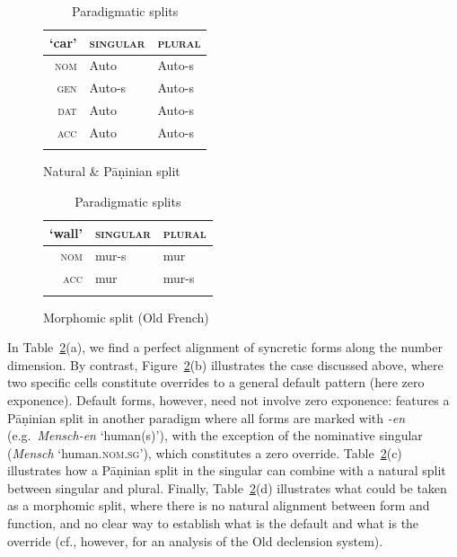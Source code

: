 \documentclass[output=paper
 	        ,biblatex
                ,babelshorthands
                ,newtxmath
                ,draftmode
                ,colorlinks, citecolor=brown
]{langscibook}
\begin{document}
\begin{table}[htb]
\begin{subfigure}{.45\textwidth}
    \begin{tabular}{r|ll}
        \lsptoprule
        `car' & \textsc{singular} & \textsc{plural}\\
        \midrule
        \textsc{nom} & Auto & Auto-s\\
        \textsc{gen} & Auto-s & Auto-s\\
        \textsc{dat} & Auto & Auto-s\\
        \textsc{acc} & Auto & Auto-s\\
        \lspbottomrule
      \end{tabular}
      \caption{Natural \& Pāṇinian split}
    \end{subfigure}
  \begin{subfigure}{.50\textwidth}

    \centering
    \begin{tabular}{r|ll}
      \lsptoprule
      `wall' & \textsc{singular} & \textsc{plural}\\
      \midrule
      \textsc{nom} & mur-s & mur\\
      \textsc{acc} & mur & mur-s\\
      \lspbottomrule
    \end{tabular}

    \caption{Morphomic split (Old French)}
  \end{subfigure}
  
  
  \caption{Paradigmatic splits}
  \label{tab:ParaSplit}
\end{table}

In Table~\ref{tab:ParaSplit}(a), we find a perfect alignment of
syncretic forms along the number dimension. By contrast,
Figure~\ref{tab:ParaSplit}(b) illustrates the case discussed above,
where two specific cells constitute overrides to a general default
pattern (here zero exponence). Default forms, however, need not
involve zero exponence:  features a Pāṇinian split in another
paradigm where all forms are marked with \textit{-en}
(e.g.\ \textit{Mensch-en} `human(s)'), with the exception of the
nominative singular (\textit{Mensch} `human\textsc{.nom.sg}'), which
constitutes a zero override. Table~\ref{tab:ParaSplit}(c) illustrates
how a Pāṇinian split in the singular can combine with a natural split
between singular and plural. Finally, Table~\ref{tab:ParaSplit}(d)
illustrates what could be taken as a morphomic split, where there is no
natural alignment between form and function, and no clear way to
establish what is the default and what is the override (cf., however,
\citealt{Crysmann:Kihm:2018} for an analysis of the Old 
declension system).
\end{document}
